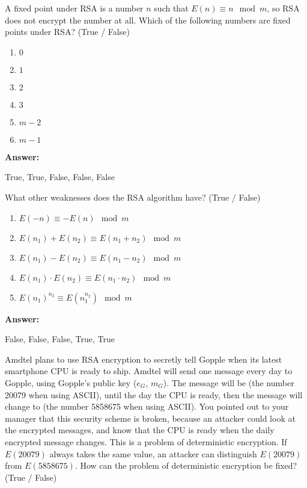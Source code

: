 \documentclass[12pt,twoside]{article}
\newcommand{\answer}{
 \par\medskip
 \textbf{Answer:}
}
\newcommand{\answerIId}{ \answer
True, True, False, False, False
}
\newcommand{\answerIIe}{ \answer
False, False, False, True, True
}
\begin{document}
\begin{problems}
\begin {problemparts}
\problempart {} A fixed point under RSA is a number $n$ such that $E(n)
\equiv n \mod m$, so RSA does not encrypt the number at all. Which of the
following numbers are fixed points under RSA? (True / False)
\begin{enumerate}
  \item $0$
  \item $1$
  \item $2$
  \item $3$
  \item $m - 2$
  \item $m - 1$
\end{enumerate}
\answerIId
  
\problempart {} What other weaknesses does the RSA algorithm have?
(True / False)
\begin{enumerate}
  \item $E(-n) \equiv -E(n) \mod m$
  \item $E(n_1) + E(n_2) \equiv E(n_1 + n_2) \mod m$
  \item $E(n_1) - E(n_2) \equiv E(n_1 - n_2) \mod m$
  \item $E(n_1) \cdot E(n_2) \equiv E(n_1 \cdot n_2) \mod m$
  \item $E(n_1)^{n_2} \equiv E(n_1 ^ {n_2}) \mod m$
\end{enumerate}
\answerIIe

\problempart {} Amdtel plans to use RSA encryption to secretly tell
Gopple when its latest smartphone CPU is ready to ship. Amdtel will send one
message every day to Gopple, using Gopple's public key ($e_G$, $m_G$). The
message will be  (the number 20079 when using ASCII), until the day
the CPU is ready, then the message will change to  (the number
5858675 when using ASCII). You pointed out to your manager that this security
scheme is broken, because an attacker could look at the encrypted messages, and
know that the CPU is ready when the daily encrypted message changes. This is a
problem of deterministic encryption. If $E(20079)$ always takes the same value,
an attacker can distinguish $E(20079)$ from $E(5858675)$. How can the problem of
deterministic encryption be fixed? (True / False)


\end{problemparts}
\end{problems}
\end{document}
